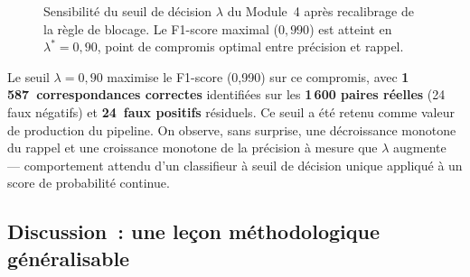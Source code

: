 \begin{figure}[H]
\centering
{}
\caption{Sensibilité du seuil de décision $\lambda$ du Module~4 après
         recalibrage de la règle de blocage. Le F1-score maximal
         ($0{,}990$) est atteint en $\lambda^{*} = 0{,}90$, point de
         compromis optimal entre précision et rappel.}
\label{fig:lambda_sensibilite}
\end{figure}

Le seuil $\lambda = 0{,}90$ maximise le F1-score (0,990) sur ce
compromis, avec \textbf{1\,587~correspondances correctes} identifiées
sur les \textbf{1\,600 paires réelles} (24 faux négatifs) et
\textbf{24~faux positifs} résiduels. Ce seuil a été retenu comme valeur
de production du pipeline. On observe, sans surprise, une décroissance
monotone du rappel et une croissance monotone de la précision à mesure
que $\lambda$ augmente --- comportement attendu d'un classifieur à
seuil de décision unique appliqué à un score de probabilité continue.


\subsection{Discussion~: une leçon méthodologique généralisable}

